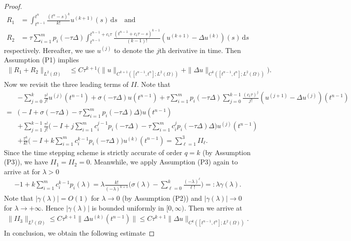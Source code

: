 \documentclass[a4paper, oneside]{book}
\def\d{{\mathrm{d}}}
\def\d{\mathrm{d}}
\def\II{(\Omega)}
\begin{document}
\begin{proof}
\begin{align*}
 R_1 &= \int_{t^{n-1}}^{t^n} \frac{(t^n-s)^k}{k!} u^{(k+1)}(s) \,\d s\quad \text{and}\quad \\
  R_2 &=   \tau \sum_{i=1}^m p_i(-\tau \Delta) \int_{t^{n-1}}^{t^{n-1}+c_i\tau} \frac{(t^{n-1}+c_i\tau-s)^{k-1}}{(k-1)!} (u^{(k+1)}-\Delta u^{(k)})(s) \,\d s
\end{align*}
respectively. Hereafter, we use $u^{(j)}$ to denote the $j$th derivative in time. Then Assumption (P1) implies
\begin{align*}
 \|R_1+R_2\|_{L^2\II} &\le C \tau^{k+1} \Big(\|  u \|_{C^{k+1} ([t^{n-1},t^n];L^2\II)} + \|  \Delta u \|_{C^{k} ([t^{n-1},t^n];L^2\II)} \Big).
\end{align*}
Now we revisit the three leading terms of $II$. Note that
\begin{align*}
& -\sum_{j=0}^k\frac{\tau^j}{j!} u^{(j)} (t^{n-1}) + \sigma(-\tau \Delta)u(t^{n-1})
  + \tau \sum_{i=1}^m p_i(-\tau \Delta) \sum_{j=0}^{k-1} \frac{(c_i\tau)^j}{j!}
  (u^{(j+1)} - \Delta u^{(j)})(t^{n-1})\\
 =& \Big(-I +  \sigma(-\tau \Delta) - \tau \sum_{i=1}^m p_i(-\tau \Delta) \Delta \Big)u(t^{n-1}) \\
 & +   \sum_{j=1}^{k-1} \frac{\tau^j}{j!} \Big(- I  +  j \sum_{i=1}^m c_i^{j-1} p_i(-\tau \Delta) - \tau\sum_{i=1}^m c_i^{j} p_i(-\tau \Delta) \Delta\Big)u^{(j)}(t^{n-1})   \\
 & +  \frac{\tau^k}{k!} \Big(-I +  k\sum_{i=1}^m c_i^{k-1}p_i(-\tau\Delta)\Big )u^{(k)}(t^{n-1}) =\sum_{\ell=1}^3 II_\ell.
\end{align*}
Since the time stepping scheme is strictly accurate of order $q=k$ (by Assumption (P3)),
we have $ II_1=  II_2=0$. Meanwhile,
we apply Assumption (P3) again to arrive at for $\lambda>0$
\begin{align*}
  -1 + k \sum_{i=1}^m c_i^{k-1} p_i(\lambda) = \lambda \frac{k!}{(-\lambda)^{k+1}} \Big(\sigma(\lambda)-\sum_{\ell=0}^k\frac{(-\lambda)^\ell}{\ell!}\Big) =: \lambda \gamma(\lambda).
\end{align*}
Note that $|\gamma(\lambda)|=O(1)$ for $\lambda\rightarrow0$ (by Assumption (P2))
and $|\gamma(\lambda)|\rightarrow 0$ for  $\lambda\rightarrow +\infty$. Hence $|\gamma(\lambda)|$ is bounded
uniformly in $[0,\infty)$. Then we arrive at
\begin{align*}
\|  II_3 \|_{L^2\II} \le C \tau^{k+1} \|  \Delta u^{(k)}(t^{n-1}) \| \le  C \tau^{k+1} \|  \Delta u \|_{C^{k}([t^{n-1},t^n];L^2\II)}.
\end{align*}
In conclusion, we obtain the following estimate

\end{proof}
\end{document}
